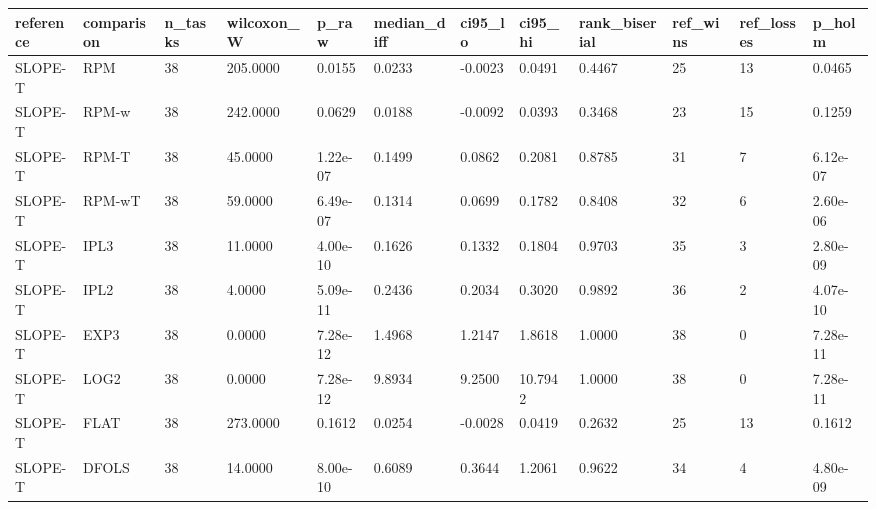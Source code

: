 \begin{tabular}{llllllllllll}
\hline
reference & comparison & n\_tasks & wilcoxon\_W & p\_raw & median\_diff & ci95\_lo & ci95\_hi & rank\_biserial & ref\_wins & ref\_losses & p\_holm \\
\hline
SLOPE-T & RPM & 38 & 205.0000 & 0.0155 & 0.0233 & -0.0023 & 0.0491 & 0.4467 & 25 & 13 & 0.0465 \\
SLOPE-T & RPM-w & 38 & 242.0000 & 0.0629 & 0.0188 & -0.0092 & 0.0393 & 0.3468 & 23 & 15 & 0.1259 \\
SLOPE-T & RPM-T & 38 & 45.0000 & 1.22e-07 & 0.1499 & 0.0862 & 0.2081 & 0.8785 & 31 & 7 & 6.12e-07 \\
SLOPE-T & RPM-wT & 38 & 59.0000 & 6.49e-07 & 0.1314 & 0.0699 & 0.1782 & 0.8408 & 32 & 6 & 2.60e-06 \\
SLOPE-T & IPL3 & 38 & 11.0000 & 4.00e-10 & 0.1626 & 0.1332 & 0.1804 & 0.9703 & 35 & 3 & 2.80e-09 \\
SLOPE-T & IPL2 & 38 & 4.0000 & 5.09e-11 & 0.2436 & 0.2034 & 0.3020 & 0.9892 & 36 & 2 & 4.07e-10 \\
SLOPE-T & EXP3 & 38 & 0.0000 & 7.28e-12 & 1.4968 & 1.2147 & 1.8618 & 1.0000 & 38 & 0 & 7.28e-11 \\
SLOPE-T & LOG2 & 38 & 0.0000 & 7.28e-12 & 9.8934 & 9.2500 & 10.7942 & 1.0000 & 38 & 0 & 7.28e-11 \\
SLOPE-T & FLAT & 38 & 273.0000 & 0.1612 & 0.0254 & -0.0028 & 0.0419 & 0.2632 & 25 & 13 & 0.1612 \\
SLOPE-T & DFOLS & 38 & 14.0000 & 8.00e-10 & 0.6089 & 0.3644 & 1.2061 & 0.9622 & 34 & 4 & 4.80e-09 \\
\hline
\end{tabular}
